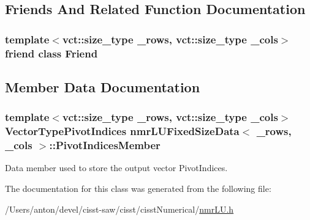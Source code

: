 \subsection{Friends And Related Function Documentation}
\hypertarget{classnmr_l_u_fixed_size_data_a7f8321d57e81bc613d5dbef3410ba70e}{}
\subsubsection[{Friend}]{\setlength{\rightskip}{0pt plus 5cm}template$<$vct\+::size\+\_\+type \+\_\+rows, vct\+::size\+\_\+type \+\_\+cols$>$ friend class {\bf Friend}\hspace{0.3cm}{\ttfamily [friend]}}\label{classnmr_l_u_fixed_size_data_a7f8321d57e81bc613d5dbef3410ba70e}


\subsection{Member Data Documentation}
\hypertarget{classnmr_l_u_fixed_size_data_afcd875504a4471fe5f0997ca8de617ad}{}
\subsubsection[{Pivot\+Indices\+Member}]{\setlength{\rightskip}{0pt plus 5cm}template$<$vct\+::size\+\_\+type \+\_\+rows, vct\+::size\+\_\+type \+\_\+cols$>$ {\bf Vector\+Type\+Pivot\+Indices} {\bf nmr\+L\+U\+Fixed\+Size\+Data}$<$ \+\_\+rows, \+\_\+cols $>$\+::Pivot\+Indices\+Member\hspace{0.3cm}{\ttfamily [protected]}}\label{classnmr_l_u_fixed_size_data_afcd875504a4471fe5f0997ca8de617ad}
Data member used to store the output vector Pivot\+Indices. 

The documentation for this class was generated from the following file\+:\begin{DoxyCompactItemize}
\item 
/\+Users/anton/devel/cisst-\/saw/cisst/cisst\+Numerical/\hyperlink{nmr_l_u_8h}{nmr\+L\+U.\+h}\end{DoxyCompactItemize}
